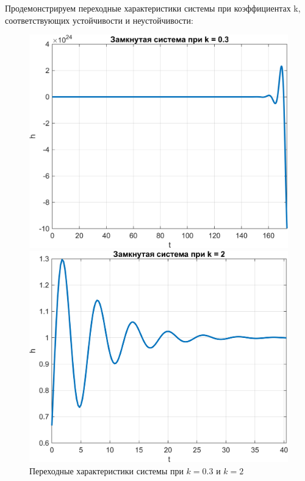 Продемонстрируем переходные характеристики системы при коэффициентах k, соответствующих устойчивости и неустойчивости:
\begin{figure}[H]
    \centering
    \begin{minipage}{0.45\textwidth}
        \centering
        \includegraphics[width=1\textwidth, trim={0cm 0cm 0cm 0cm}]{../images/2_2_1_cl.png}
    \end{minipage}
    \hfill
    \begin{minipage}{0.45\textwidth}
        \centering
        \includegraphics[width=1\textwidth, trim={0cm 0cm 0cm 0cm}]{../images/2_2_2_cl.png}
    \end{minipage}
    \caption{Переходные характеристики системы при $k = 0.3$ и $k = 2$}
\end{figure}
\endinput

